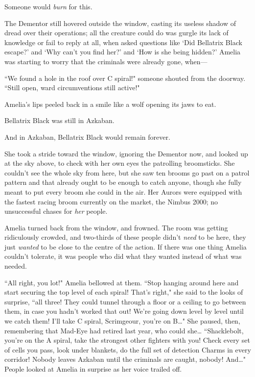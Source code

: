 Someone would \emph{burn} for this.

The Dementor still hovered outside the window, casting its useless shadow of dread over their operations; all the creature could do was gurgle its lack of knowledge or fail to reply at all, when asked questions like `Did Bellatrix Black escape?' and `Why can't you find her?' and `How is she being hidden?' Amelia was starting to worry that the criminals were already gone, when—

``We found a hole in the roof over C spiral!" someone shouted from the doorway. ``Still open, ward circumventions still active!"

Amelia's lips peeled back in a smile like a wolf opening its jaws to eat.

Bellatrix Black was still in Azkaban.

And in Azkaban, Bellatrix Black would remain forever.

She took a stride toward the window, ignoring the Dementor now, and looked up at the sky above, to check with her own eyes the patrolling broomsticks. She couldn't see the whole sky from here, but she saw ten brooms go past on a patrol pattern and that already ought to be enough to catch anyone, though she fully meant to put every broom she could in the air. Her Aurors were equipped with the fastest racing broom currently on the market, the Nimbus 2000; no unsuccessful chases for \emph{her} people.

Amelia turned back from the window, and frowned. The room was getting ridiculously crowded, and two-thirds of these people didn't \emph{need} to be here, they just \emph{wanted} to be close to the centre of the action. If there was one thing Amelia couldn't tolerate, it was people who did what they wanted instead of what was needed.

``All right, you lot!" Amelia bellowed at them. ``Stop hanging around here and start securing the top level of each spiral! That's right," she said to the looks of surprise, ``all three! They could tunnel through a floor or a ceiling to go between them, in case you hadn't worked that out! We're going down level by level until we catch them! I'll take C spiral, Scrimgeour, you're on B{\ldots}" She paused, then, remembering that Mad-Eye had retired last year, who could she{\ldots} ``Shacklebolt, you're on the A spiral, take the strongest other fighters with you! Check every set of cells you pass, look under blankets, do the full set of detection Charms in every corridor! Nobody leaves Azkaban until the criminals are caught, nobody! And{\ldots}" People looked at Amelia in surprise as her voice trailed off.

